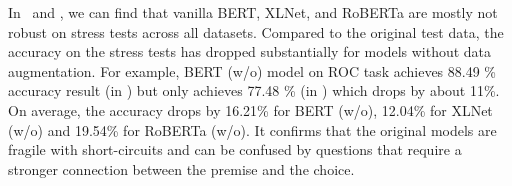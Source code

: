


In~ and , we can find 
that vanilla BERT, XLNet, and RoBERTa 
are mostly not robust on stress tests across all datasets.
Compared to the original test data, 
the accuracy on the stress tests has dropped substantially for models 
without data augmentation. 
For example, BERT (w/o) model on ROC task achieves 88.49 \% accuracy result (in ) 
but only achieves 77.48 \% (in ) which drops by about 11\%.
On average, the accuracy drops by 16.21\% for BERT (w/o), 12.04\% for XLNet (w/o) 
and 19.54\% for RoBERTa (w/o). 
It confirms that the original models are fragile with short-circuits and 
can be confused by questions that require a stronger connection between the premise
and the choice. 

